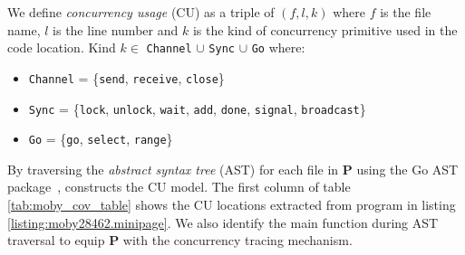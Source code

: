 %
We define \textit{concurrency usage} (CU) as a triple of $(f,l,k)$ where $f$ is the file name, $l$ is the line number and $k$ is the kind of concurrency primitive used in the code location.
Kind $k\in$ \texttt{Channel} $\cup$ \texttt{Sync} $\cup$ \texttt{Go} where:
\begin{itemize}
  \item \texttt{Channel} = \{\texttt{send}, \texttt{receive}, \texttt{close}\}
  \item \texttt{Sync} = \{\texttt{lock}, \texttt{unlock}, \texttt{wait}, \texttt{add}, \texttt{done}, \texttt{signal}, \texttt{broadcast}\}
  \item \texttt{Go} = \{\texttt{go}, \texttt{select}, \texttt{range}\}
\end{itemize}

By traversing the \textit{abstract syntax tree} (AST) for each file in \textbf{P} using the Go AST package~\cite{go-package-ast}, \goat constructs the CU model.
%
The first column of table \ref{tab:moby_cov_table} shows the CU locations extracted from program in listing \ref{listing:moby28462.minipage}.
%
We also identify the main function during AST traversal to equip \textbf{P} with the concurrency tracing mechanism.
%

